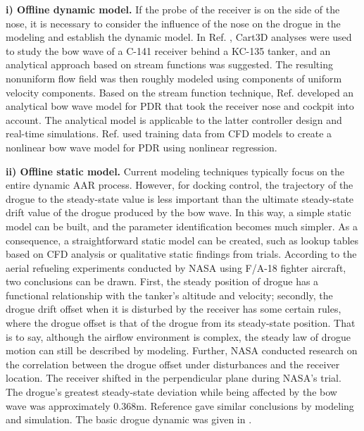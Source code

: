 \textbf{i) Offline dynamic model.} If the probe of the receiver is
on the side of the nose, it is necessary to consider the influence
of the nose on the drogue in the modeling and establish the dynamic
model. In Ref. \cite{Dogan-2013-7}, Cart3D analyses were used to
study the bow wave of a C-141 receiver behind a KC-135 tanker, and
an analytical approach based on stream functions was suggested. The
resulting nonuniform flow field was then roughly modeled using components
of uniform velocity components. Based on the stream function technique,
Ref.\cite{dai2016modeling} developed an analytical bow wave model
for PDR that took the receiver nose and cockpit into account. The
analytical model is applicable to the latter controller design and
real-time simulations. Ref. \cite{wei2016drogue} used training data
from CFD models to create a nonlinear bow wave model for PDR using
nonlinear regression. 

\textbf{ii) Offline static model.} Current modeling techniques typically
focus on the entire dynamic AAR process. However, for docking control,
the trajectory of the drogue to the steady-state value is less important
than the ultimate steady-state drift value of the drogue produced
by the bow wave. In this way, a simple static model can be built,
and the parameter identification becomes much simpler. As a consequence,
a straightforward static model can be created, such as lookup tables
based on CFD analysis or qualitative static findings from trials.
According to the aerial refueling experiments conducted by NASA using
F/A-18 fighter aircraft, two conclusions can be drawn. First, the
steady position of drogue has a functional relationship with the tanker\textquoteright s
altitude and velocity; secondly, the drogue drift offset when it is
disturbed by the receiver has some certain rules, where the drogue
offset is that of the drogue from its steady-state position. That
is to say, although the airflow environment is complex, the steady
law of drogue motion can still be described by modeling. Further,
NASA conducted research on the correlation between the drogue offset
under disturbances and the receiver location. The receiver shifted
in the perpendicular plane during NASA's trial\cite{Hansen-2004-4}.
The drogue's greatest steady-state deviation while being affected
by the bow wave was approximately 0.368m. Reference \cite{Ro-2010-5}
gave similar conclusions by modeling and simulation. The basic drogue
dynamic was given in \cite{zibo2012research}.


